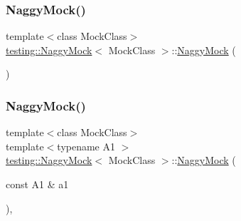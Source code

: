 \subsubsection{\texorpdfstring{NaggyMock()}{NaggyMock()}\hspace{0.1cm}{\footnotesize\ttfamily [1/11]}}
{\footnotesize\ttfamily template$<$class Mock\+Class$>$ \\
\mbox{\hyperlink{classtesting_1_1NaggyMock}{testing\+::\+Naggy\+Mock}}$<$ Mock\+Class $>$\+::\mbox{\hyperlink{classtesting_1_1NaggyMock}{Naggy\+Mock}} (\begin{DoxyParamCaption}{ }\end{DoxyParamCaption})\hspace{0.3cm}{\ttfamily [inline]}}

\mbox{\label{classtesting_1_1NaggyMock_ae43ea6c6a6b66fe31cb14f93e0be5718}} 
\subsubsection{\texorpdfstring{NaggyMock()}{NaggyMock()}\hspace{0.1cm}{\footnotesize\ttfamily [2/11]}}
{\footnotesize\ttfamily template$<$class Mock\+Class$>$ \\
template$<$typename A1 $>$ \\
\mbox{\hyperlink{classtesting_1_1NaggyMock}{testing\+::\+Naggy\+Mock}}$<$ Mock\+Class $>$\+::\mbox{\hyperlink{classtesting_1_1NaggyMock}{Naggy\+Mock}} (\begin{DoxyParamCaption}\item[{const A1 \&}]{a1 }\end{DoxyParamCaption})\hspace{0.3cm}{\ttfamily [inline]}, {\ttfamily [explicit]}}

\mbox{\label{classtesting_1_1NaggyMock_a4241363ab2ca3a2e7baa5ead980175e6}} 
